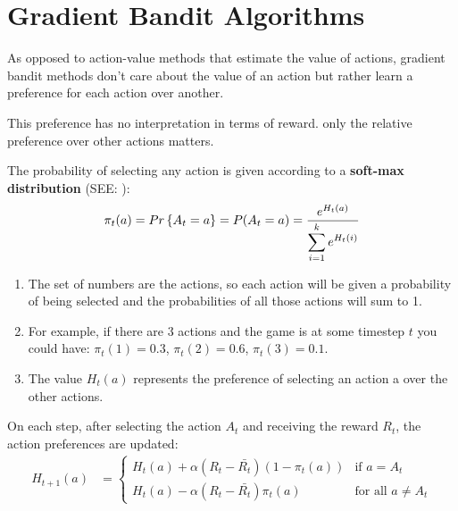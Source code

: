 \section{Gradient Bandit Algorithms \cite{medium-numsmt2-rl-ch2-part-5}}\label{MAB: Gradient Bandit Algorithms}

As opposed to action-value methods that estimate the value of actions, gradient bandit methods don’t care about the value of an action but rather learn a preference for each action over another.

This preference has no interpretation in terms of reward. only the relative preference over other actions matters.

The probability of selecting any action is given according to a \textbf{soft-max distribution} (SEE: ):
\[
    \pi_t(a) = Pr\left\{A_t = a\right\} = P(A_t=a) = \displaystyle\dfrac{e^{H_t(a)}}{\displaystyle\sum_{i=1}^{k} e^{H_t(i)}}
\]

\begin{enumerate}
    \item The set of numbers are the actions, so each action will be given a probability of being selected and the probabilities of all those actions will sum to 1.
    \item For example, if there are 3 actions and the game is at some timestep $t$ you could have: $\pi_t(1) = 0.3$, $\pi_t(2) = 0.6$, $\pi_t(3) = 0.1$.
    \item The value $H_t(a)$ represents the preference of selecting an action a over the other actions.
\end{enumerate}

\vspace{0.2cm}

On each step, after selecting the action $A_t$ and receiving the reward $R_t$, the action preferences are updated:
\begin{align*}
    H_{t+1}(a) &= 
    \begin{cases}
        H_t(a) + \alpha(R_t - \bar{R_t})(1-\pi_t(a)) & \text{if } a = A_t \\
        H_t(a) - \alpha(R_t - \bar{R_t})\pi_t(a) & \text{for all } a \neq A_t
    \end{cases}
\end{align*}

